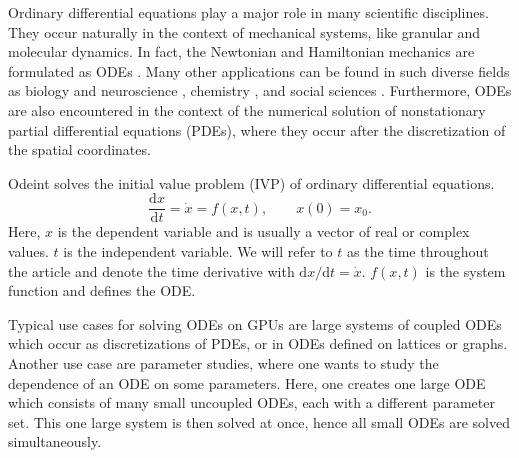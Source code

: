 \documentclass[final]{siamltex}
\newcommand {\de} {\mbox{d}}
\begin{document}
Ordinary differential equations play a major role in many scientific
disciplines. They occur naturally in the context of mechanical
systems, like granular \cite{poschel_computational_2005} and molecular dynamics. In fact, the Newtonian
and Hamiltonian mechanics are formulated as ODEs
\cite{landau_mechanics_1976}.  Many other applications can be found in
such diverse fields as biology
\cite{brauer_mathematical_2001,Murray-93} and neuroscience
\cite{izhikevich_dynamical_2006}, chemistry
\cite{atkins_physical_2001}, and social sciences
\cite{Helbing01}. Furthermore, ODEs are also encountered in the
context of the numerical solution of nonstationary partial
differential equations (PDEs), where they occur after the
discretization of the spatial coordinates.


Odeint solves %
the initial value problem (IVP) of ordinary differential equations.
\begin{equation}
\frac{\de x}{\de t } = \dot{x} = f(x , t), \quad \quad x(0) =
x_0.
\label{eq:ode}
\end{equation}
Here, $x$ is the dependent variable and is usually a vector of real or complex values.
$t$ is the independent variable. We will refer to $t$ as the time throughout the article and
denote the time derivative with $\de x / \de t = \dot{x}$. $f(x,t)$ is
the system function and defines the ODE.

Typical use cases for solving ODEs on GPUs are large systems of
coupled ODEs which occur as discretizations of PDEs, or in ODEs
defined on lattices or graphs. Another use case are parameter studies,
where one wants to study the dependence of an ODE on some
parameters. Here, one creates one large ODE which consists of many
small uncoupled ODEs, each with a different parameter set. This one
large system is then solved at once, hence all small ODEs are solved
simultaneously.
\end{document}
